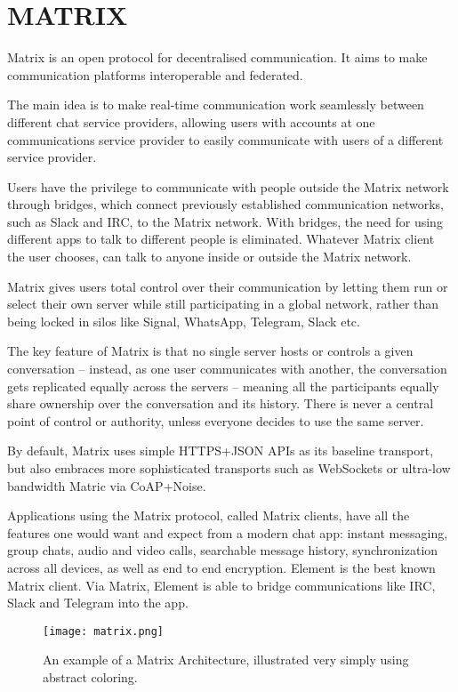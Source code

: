\section{MATRIX}

Matrix is an open protocol for decentralised communication. It aims to make 
communication platforms interoperable and federated.

The main idea is to make real-time communication work seamlessly between different chat 
service providers, allowing users with accounts at one communications service provider to 
easily communicate with users of a different service provider.

Users have the privilege to communicate with people outside the Matrix network through bridges, 
which connect previously established communication networks, such as Slack and IRC, to the Matrix network.
With bridges, the need for using different apps to talk to different people is eliminated. Whatever Matrix 
client the user chooses, can talk to anyone inside or outside the Matrix network.

Matrix gives users total control over their communication by letting them run or select their own 
server while still participating in a global network, rather than being locked in silos 
like Signal, WhatsApp, Telegram, Slack etc. 

The key feature of Matrix is that no single server hosts or controls a given conversation -- instead, 
as one user communicates with another, the conversation gets replicated equally across the servers -- meaning 
all the participants equally share ownership over the conversation and its history. 
There is never a central point of control or authority, 
unless everyone decides to use the same server.~\cite{MATRIXorgOpenProtocol}

By default, Matrix uses simple HTTPS+JSON APIs as its baseline transport, but also embraces 
more sophisticated transports such as WebSockets or ultra-low bandwidth Matric via CoAP+Noise.~\cite{MATRIX}

Applications using the Matrix protocol, called Matrix clients, have all the features one would
want and expect from a modern chat app: instant messaging, group chats, audio and video calls, 
searchable message history, synchronization across all devices, as well as end to end encryption.
Element is the best known Matrix client.
Via Matrix, Element is able to bridge communications like IRC, Slack and Telegram into the app.~\cite{RumaMATRIX}

\begin{figure}[h]
    \begin{center}
        \texttt{[image: matrix.png]}
    \end{center}
    \caption{An example of a Matrix Architecture, illustrated very simply using abstract coloring.}
    \label{fig:matrix}
\end{figure}

